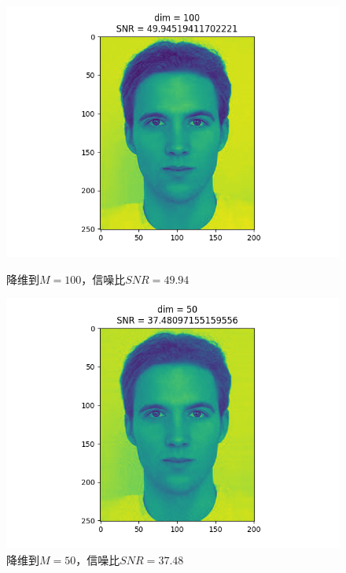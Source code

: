 \begin{figure}[htbp]
    \begin{minipage}[t]{0.3\linewidth}
        \centering
        \includegraphics[width=\textwidth]{figures/Figure_14.png}
        \caption{降维到$M=100$，信噪比$SNR=49.94$}
        \label{m100}
    \end{minipage}
    \begin{minipage}[t]{0.3\linewidth}
        \centering
        \includegraphics[width=\textwidth]{figures/Figure_15.png}
        \caption{降维到$M=50$，信噪比$SNR=37.48$}
        \label{m50}
    \end{minipage}
    \begin{minipage}[t]{0.3\linewidth}
        \centering

\end{minipage}
\end{figure}
